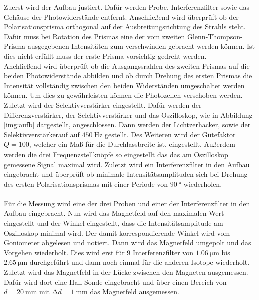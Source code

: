 \noindent
Zuerst wird der Aufbau justiert. Dafür werden Probe, Interferenzfilter sowie das Gehäuse der Photowiderstände entfernt.
Anschließend wird überprüft ob der Polarisationsprisma orthogonal auf der Ausbreitungsrichtung des Strahls steht.
Dafür muss bei Rotation des Prismas eine der vom zweiten Glenn-Thompson-Prisma ausgegebenen Intensitäten zum verschwinden gebracht werden können.
Ist dies nicht erfüllt muss der erste Prisma vorsichtig gedreht werden.\\
Anchließend wird überprüft ob die Ausgangssrahlen des zweiten Prismas auf die beiden Photowiderstände abbilden und 
ob durch Drehung des ersten Prismas die Intensität vollständig zwischen den beiden Widerständen umgeschaltet werden können.
Um dies zu gewährleisten können die Photozellen verschoben werden.\\
Zuletzt wird der Selektivverstärker eingestellt. 
Dafür werden der Differenzverstärker, der Selektivverstärker und das Oszilloskop, wie in Abbildung \ref{img:aufb} dargestellt, angeschlossen.
Dann werden der Lichtzerhacker, sowie der Selektivverstärkerauf auf $\SI{450}{\hertz}$ gestellt. 
Des Weiteren wird der Gütefaktor $Q = 100$, welcher ein Maß für die Durchlassbreite ist, eingestellt. 
Außerdem werden die drei Frequenzstellknöpfe so eingestellt das das am Oszilloskop gemessene Signal maximal wird.
Zuletzt wird ein Interferenzfilter in den Aufbau eingebracht und überprüft ob minimale Intensitätsamplituden sich bei Drehung 
des ersten Polarisationsprismas mit einer Periode von $\SI{90}{\degree}$ wiederholen.\\\\
Für die Messung wird eine der drei Proben und einer der Interferenzfilter in den Aufbau eingebracht.
Nun wird das Magnetfeld auf den maximalen Wert eingestellt und der Winkel eingestellt, dass die Intensitätsamplitude am Oszilloskop minimal wird.
Der damit korrespondierende Winkel wird vom Goniometer abgelesen und notiert. Dann wird das Magnetfeld umgepolt und das Vorgehen wiederholt.
Dies wird erst für 9 Interferenzfilter von $\SI{1.06}{\micro\meter}$ bis $\SI{2.65}{\micro\meter}$ durchgeführt und dann noch einmal für die anderen Isotope wiederholt.\\
Zuletzt wird das Magnetfeld in der Lücke zwischen den Magneten ausgemessen. 
Dafür wird dort eine Hall-Sonde eingebracht und über einen Bereich von $d = \SI{20}{\milli\metre}$ mit $\increment d = \SI{1}{\milli\metre}$ das Magnetfeld ausgemessen.